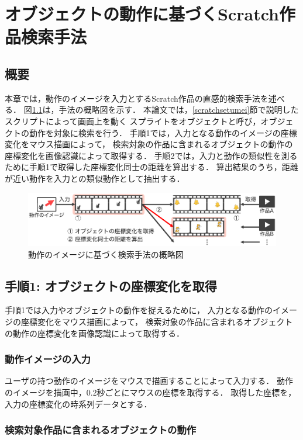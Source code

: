 \documentclass[11pt]{jreport}
\begin{document}
\chapter{オブジェクトの動作に基づくScratch作品検索手法}

\section{概要}
本章では，動作のイメージを入力とするScratch作品の直感的検索手法を述べる．
図\ref{flow}は，手法の概略図を示す．
本論文では，\ref{scratchsetumei}節で説明したスクリプトによって画面上を動く
スプライトをオブジェクトと呼び，オブジェクトの動作を対象に検索を行う．
手順1では，入力となる動作のイメージの座標変化をマウス描画によって，
検索対象の作品に含まれるオブジェクトの動作の座標変化を画像認識によって取得する．
手順2では，入力と動作の類似性を測るために手順1で取得した座標変化同士の距離を算出する．
算出結果のうち，距離が近い動作を入力との類似動作として抽出する．

\begin{figure}[H]
    \centering
    \includegraphics[width=15cm]{flow.eps}
    \caption{動作のイメージに基づく検索手法の概略図}
    \label{flow}
\end{figure}


\section{手順1: オブジェクトの座標変化を取得}
手順1では入力やオブジェクトの動作を捉えるために，
入力となる動作のイメージの座標変化をマウス描画によって，
検索対象の作品に含まれるオブジェクトの動作の座標変化を画像認識によって取得する．

\subsection{動作イメージの入力}
ユーザの持つ動作のイメージをマウスで描画することによって入力する．
動作のイメージを描画中，0.2秒ごとにマウスの座標を取得する．
取得した座標を，入力の座標変化の時系列データとする．

\subsection{検索対象作品に含まれるオブジェクトの動作}
\label{objectbehavior}
\end{document}
